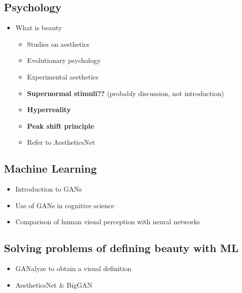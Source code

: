 \documentclass[../main.tex]{subfiles}
\begin{document}
	\subsection{Psychology}
		\begin{itemize}
			\item What is beauty
			\begin{itemize}
				\item Studies on aesthetics
				\item Evolutionary psychology
				\item Experimental aesthetics
				\item \textbf{Supernormal stimuli??} (probably discussion, not introduction)
				\item \textbf{Hyperreality}
				\item \textbf{Peak shift principle}
				\item Refer to AestheticsNet
			\end{itemize}
		\end{itemize}
	
	\subsection{Machine Learning}
		\begin{itemize}
			\item Introduction to GANs
			\item Use of GANs in cognitive science
			\item Comparison of human visual perception with neural networks
		\end{itemize}

	\subsection{Solving problems of defining beauty with ML}
		\begin{itemize}
			\item GANalyze to obtain a visual definition
			\item AestheticsNet \& BigGAN
		\end{itemize}
\end{document}

